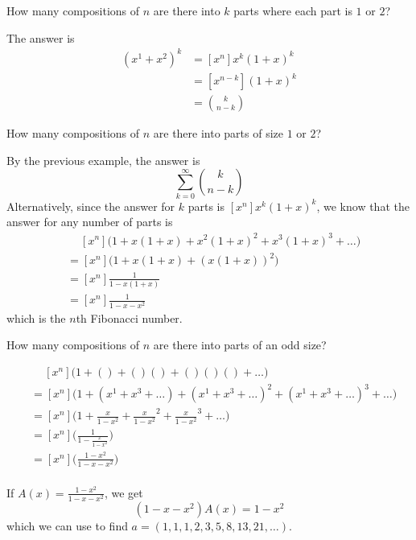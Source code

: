 \documentclass[12pt]{article}
\begin{document}
\begin{example}
How many compositions of $n$ are there into $k$ parts where each part is $1$ or $2$?

The answer is
\begin{align*}
[x^n]{(x^1 + x^2)}^k &= [x^n]x^k{(1+x)}^k\\
&= [x^{n-k}] {(1+x)}^k\\
&= {k \choose n-k}
\end{align*}
\end{example}

\begin{example}
How many compositions of $n$ are there into parts of size $1$ or $2$?

By the previous example, the answer is \[ \sum_{k=0}^\infty {k \choose n-k} \] Alternatively, since the answer for $k$ parts is $[x^n] x^k{(1+x)}^k$, we know that the answer for any number of parts is
\begin{align*}
&\quad\ [x^n]\bigl(1 + x(1+x) + x^2{(1+x)}^2 + x^3{(1+x)}^3 + \dots \bigl)\\
&= [x^n]\bigl(1 + x(1+x) + {(x(1+x))}^2\bigl)\\
&= [x^n]\frac{1}{1-x(1+x)}\\
&= [x^n]\frac{1}{1-x-x^2}
\end{align*}
which is the $n$th Fibonacci number.
\end{example}

\begin{example}
How many compositions of $n$ are there into parts of an odd size?

\begin{align*}
&\quad\ [x^n]\bigg(1 + () + ()() + ()()() + \dots\bigg)\\
&= [x^n]\bigg(1 + (x^1 + x^3 + \dots) + {(x^1 + x^3 + \dots)}^2 + {(x^1 + x^3 + \dots)}^3 + \dots\bigg)\\
&= [x^n]\bigg(1 + \frac{x}{1-x^2} + {\frac{x}{1-x^2}}^2 + {\frac{x}{1-x^2}}^3 + \dots\bigg)\\
&= [x^n]\bigg(\frac{1}{1 - \frac{x}{1 - x^2}}\bigg)\\
&= [x^n]\bigg(\frac{1 - x^2}{1 - x - x^2}\bigg)\\
\end{align*}

If $A(x) = \frac{1-x^2}{1-x-x^2}$, we get \[ (1-x-x^2)A(x) = 1-x^2 \] which we can use to find $a = (1,1,1,2,3,5,8,13,21,\dots)$.
\end{example}
\end{document}
